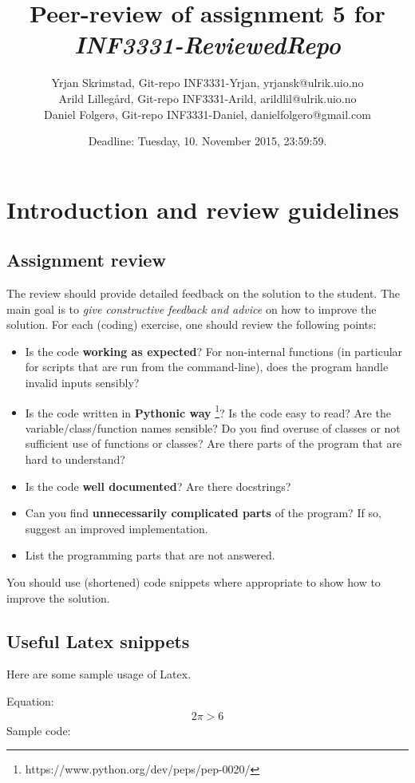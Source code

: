 \documentclass[a4paper]{article}
\title{Peer-review of assignment 5 for \textit{INF3331-ReviewedRepo}}
\author{Yrjan Skrimstad, Git-repo INF3331-Yrjan, {yrjansk@ulrik.uio.no} \\
        Arild Lillegård, Git-repo INF3331-Arild, {arildlil@ulrik.uio.no} \\
        Daniel Folgerø, Git-repo INF3331-Daniel, {danielfolgero@gmail.com}}
\date{Deadline: Tuesday, 10. November 2015, 23:59:59.}
\begin{document}
\maketitle

\section{Introduction and review guidelines}

\subsection{Assignment review}\label{sec:general_review}

The review should provide detailed feedback on the solution to the student. The main goal is to \emph{give constructive feedback and advice} on how to improve the solution. For each (coding) exercise, one should review the following points:

\begin{itemize}
  \item Is the code \textbf{working as expected}? For non-internal functions (in particular for scripts that are run from the command-line), does the program handle invalid inputs sensibly?
  \item Is the code written in \textbf{Pythonic way} \footnote{https://www.python.org/dev/peps/pep-0020/}? Is the code easy to read? Are the variable/class/function names sensible? Do you find overuse of classes or not sufficient use of functions or classes? Are there parts of the program that are hard to understand? 
  \item Is the code \textbf{well documented}? Are there docstrings?
  \item Can you find \textbf{unnecessarily complicated parts} of the program? If so, suggest an improved implementation.
  \item List the programming parts that are not answered.
\end{itemize}
You should use (shortened) code snippets where appropriate to show how to improve the solution. 


\subsection{Useful Latex snippets}
Here are some sample usage of Latex.

\noindent
Equation:
\begin{align}
2 \pi > 6
\end{align}
Sample code:
\end{document}
